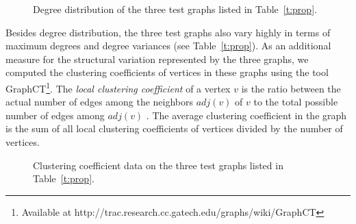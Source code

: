 \documentclass{article}
\begin{document}
\begin{figure}
\centering
{}
\caption{Degree distribution of the three test graphs listed in Table~\ref{t:prop}.}
\label{f:deg-Dist}
\end{figure}

Besides degree distribution, the three test graphs  also vary highly
in terms of maximum degrees and degree variances (see Table~\ref{t:prop}).
As an additional measure for the structural variation represented by the three graphs, 
we computed the clustering coefficients of vertices in these graphs
using the tool GraphCT\footnote{Available at http://trac.research.cc.gatech.edu/graphs/wiki/GraphCT}.
The {\em local clustering coefficient} of a vertex $v$ is the ratio between the actual number of edges 
among the neighbors $\mathit{adj}(v)$ of $v$ to the total possible number of edges 
among $\mathit{adj}(v)$ \cite{citeulike:99}. 
The average clustering coefficient in the graph is the sum of all local clustering coefficients 
of vertices divided by the number of vertices.

\begin{figure}
\caption{Clustering coefficient data on the three test graphs listed in Table~\ref{t:prop}.}
\label{f:cc}
\end{figure}
\end{document}
